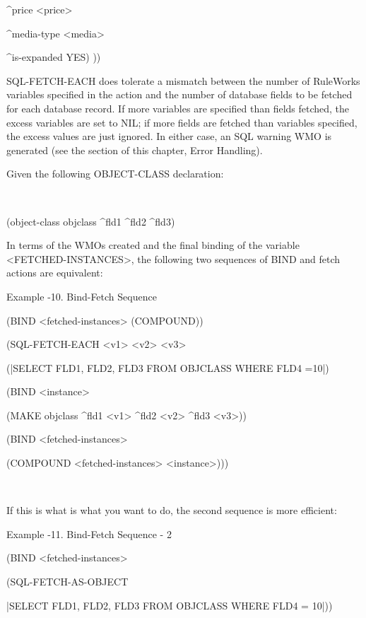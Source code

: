           ^price <price>

          ^media-type <media>

          ^is-expanded YES) ))

          SQL-FETCH-EACH does tolerate a mismatch
          between the number of RuleWorks variables
          specified in the action and the number of
          database fields to be fetched for each
          database record. If more variables are
          specified than fields fetched, the excess
          variables are set to NIL; if more fields
          are fetched than variables specified, the
          excess values are just ignored. In either
          case, an SQL warning WMO is generated
          (see the section of this chapter, Error
          Handling).

          Given the following OBJECT-CLASS
          declaration:

           

          (object-class objclass ^fld1 ^fld2 ^fld3)

          In terms of the WMOs created and the
          final binding of the variable
          <FETCHED-INSTANCES>, the following two
          sequences of BIND and fetch actions are
          equivalent:

          Example -10. Bind-Fetch Sequence

          (BIND <fetched-instances> (COMPOUND))

          (SQL-FETCH-EACH <v1> <v2> <v3>

          (|SELECT FLD1, FLD2, FLD3 FROM OBJCLASS
          WHERE FLD4 =10|)

          (BIND <instance>

          (MAKE objclass ^fld1 <v1> ^fld2 <v2>
          ^fld3 <v3>))

          (BIND <fetched-instances>

          (COMPOUND <fetched-instances>
          <instance>)))

           

          If this is what is what you want to do,
          the second sequence is more efficient:

          Example -11. Bind-Fetch Sequence - 2

          (BIND <fetched-instances>

          (SQL-FETCH-AS-OBJECT

          |SELECT FLD1, FLD2, FLD3 FROM OBJCLASS
          WHERE FLD4 = 10|))

